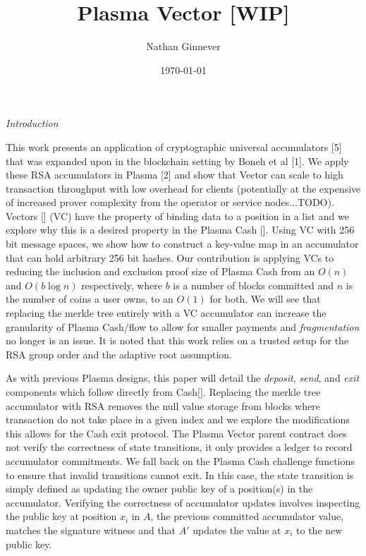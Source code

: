 \documentclass[11pt]{article}
\title{Plasma Vector [WIP]}
\author{Nathan Ginnever}
\date{\today}
\begin{document}
\maketitle
\centerline{\textit{Introduction}}

This work presents an application of cryptographic universal accumulators [5] that was expanded upon in the blockchain setting by Boneh et al [1]. We apply these RSA accumulators in Plasma [2] and show that Vector can scale to high transaction throughput with low overhead for clients (potentially at the expensive of increased prover complexity from the operator or service nodes...TODO). Vectors [] (VC) have the property of binding data to a position in a list and we explore why this is a desired property in the Plasma Cash []. Using VC with 256 bit message spaces, we show how to construct a key-value map in an accumulator that can hold arbitrary 256 bit hashes. Our contribution is applying VCs to reducing the inclusion and exclusion proof size of Plasma Cash from an $O(n)$ and $O(b \log n)$ respectively, where $b$ is a number of blocks committed and $n$ is the number of coins a user owns, to an $O(1)$ for both. We will see that replacing the merkle tree entirely with a VC accumulator can increase the granularity of Plasma Cash/flow to allow for smaller payments and \textit{fragmentation} no longer is an issue. It is noted that this work relies on a trusted setup for the RSA group order and the adaptive root assumption. 

As with previous Plasma designs, this paper will detail the \textit{deposit}, \textit{send}, and \textit{exit} components which follow directly from Cash[]. Replacing the merkle tree accumulator with RSA removes the null value storage from blocks where transaction do not take place in a given index and we explore the modifications this allows for the Cash exit protocol.  The Plasma Vector parent contract does not verify the correctness of state transitions, it only provides a ledger to record accumulator commitments. We fall back on the Plasma Cash challenge functions to ensure that invalid transitions cannot exit. In this case, the state transition is simply defined as updating the owner public key of a position(s) in the accumulator. Verifying the correctness of accumulator updates involves inspecting the public key at position $x_i$ in $A$, the previous committed accumulator value, matches the signature witness and that $A'$ updates the value at $x_i$ to the new public key. 
\\
\\
\end{document}
